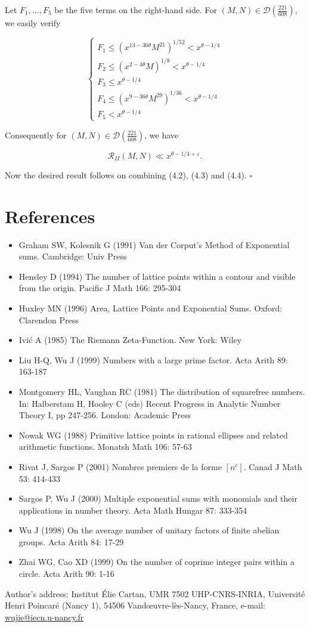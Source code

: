 \documentclass[10pt]{article}
\begin{document}
Let $F_{1}, \ldots, F_{5}$ be the five terms on the right-hand side. For $(M, N) \in \mathscr{D}\left(\frac{221}{608}\right)$, we easily verify

$$
\left\{\begin{array}{l}
F_{1} \leqslant\left(x^{13-36 \theta} M^{21}\right)^{1 / 52}<x^{\theta-1 / 4} \\
F_{2} \leqslant\left(x^{2-4 \theta} M\right)^{1 / 8}<x^{\theta-1 / 4} \\
F_{3} \leqslant x^{\theta-1 / 4} \\
F_{4} \leqslant\left(x^{9-36 \theta} M^{29}\right)^{1 / 36}<x^{\theta-1 / 4} \\
F_{5}<x^{\theta-1 / 4}
\end{array}\right.
$$

Consequently for $(M, N) \in \mathscr{D}\left(\frac{221}{608}\right)$, we have


\begin{equation*}
\mathscr R_{II}(M, N) \ll x^{\theta-1 / 4+\varepsilon} . \tag{4.4}
\end{equation*}


Now the desired result follows on combining (4.2), (4.3) and (4.4). \(\square\)

\section*{References}
\begin{itemize}
  \item[] [1] Graham SW, Kolesnik G (1991) Van der Corput's Method of Exponential sums. Cambridge: Univ Press
  \item[] [2] Hensley D (1994) The number of lattice points within a contour and visible from the origin. Pacific J Math 166: 295-304
  \item[] [3] Huxley MN (1996) Area, Lattice Points and Exponential Sums. Oxford: Clarendon Press
  \item[] [4] Ivić A (1985) The Riemann Zeta-Function. New York: Wiley
  \item[] [5] Liu H-Q, Wu J (1999) Numbers with a large prime factor. Acta Arith 89: 163-187
  \item[] [6] Montgomery HL, Vaughan RC (1981) The distribution of squarefree numbers. In: Halberstam H, Hooley C (eds) Recent Progress in Analytic Number Theory I, pp 247-256. London: Academic Press
  \item[] [7] Nowak WG (1988) Primitive lattice points in rational ellipses and related arithmetic functions. Monatsh Math 106: 57-63
  \item[] [8] Rivat J, Sargos P (2001) Nombres premiers de la forme $\left[n^{c}\right]$. Canad J Math 53: 414-433
  \item[] [9] Sargos P, Wu J (2000) Multiple exponential sums with monomials and their applications in number theory. Acta Math Hungar 87: 333-354
  \item[] [10] Wu J (1998) On the average number of unitary factors of finite abelian groups. Acta Arith 84: 17-29
  \item[] [11] Zhai WG, Cao XD (1999) On the number of coprime integer pairs within a circle. Acta Arith 90: 1-16
\end{itemize}

Author's address: Institut Élie Cartan, UMR 7502 UHP-CNRS-INRIA, Université Henri Poincaré (Nancy 1), 54506 Vandœuvre-lès-Nancy, France, e-mail: \href{mailto:wujie@iecn.u-nancy.fr}{wujie@iecn.u-nancy.fr}
\end{document}
